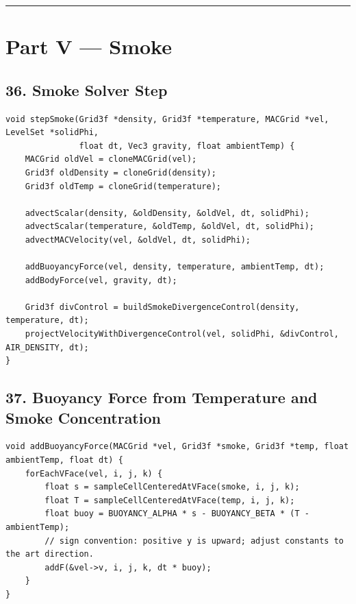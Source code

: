 \documentclass[10pt,letterpaper]{article}
\begin{document}
\medskip\hrule\medskip

\clearpage
{}
\section*{Part V --- Smoke}

\subsection*{36. Smoke Solver Step}

\begin{verbatim}
void stepSmoke(Grid3f *density, Grid3f *temperature, MACGrid *vel, LevelSet *solidPhi,
               float dt, Vec3 gravity, float ambientTemp) {
    MACGrid oldVel = cloneMACGrid(vel);
    Grid3f oldDensity = cloneGrid(density);
    Grid3f oldTemp = cloneGrid(temperature);

    advectScalar(density, &oldDensity, &oldVel, dt, solidPhi);
    advectScalar(temperature, &oldTemp, &oldVel, dt, solidPhi);
    advectMACVelocity(vel, &oldVel, dt, solidPhi);

    addBuoyancyForce(vel, density, temperature, ambientTemp, dt);
    addBodyForce(vel, gravity, dt);

    Grid3f divControl = buildSmokeDivergenceControl(density, temperature, dt);
    projectVelocityWithDivergenceControl(vel, solidPhi, &divControl, AIR_DENSITY, dt);
}
\end{verbatim}

\subsection*{37. Buoyancy Force from Temperature and Smoke Concentration}

\begin{verbatim}
void addBuoyancyForce(MACGrid *vel, Grid3f *smoke, Grid3f *temp, float ambientTemp, float dt) {
    forEachVFace(vel, i, j, k) {
        float s = sampleCellCenteredAtVFace(smoke, i, j, k);
        float T = sampleCellCenteredAtVFace(temp, i, j, k);
        float buoy = BUOYANCY_ALPHA * s - BUOYANCY_BETA * (T - ambientTemp);
        // sign convention: positive y is upward; adjust constants to the art direction.
        addF(&vel->v, i, j, k, dt * buoy);
    }
}
\end{verbatim}
\end{document}
